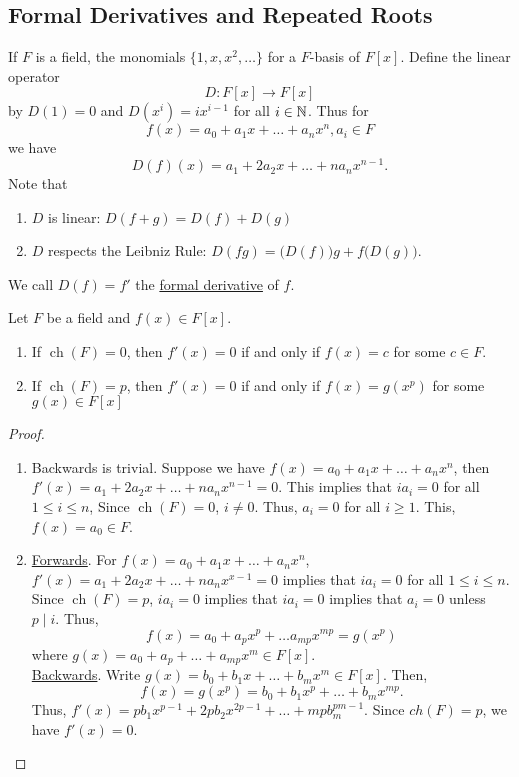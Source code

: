 \documentclass[11pt]{article}
\DeclareMathOperator{\ch}{ch}
\begin{document}
\subsection{Formal Derivatives and Repeated Roots}
\begin{definition}
If $F$ is a field, the monomials $\{1, x, x^2, \dots\}$ for a $F$-basis of
$F[x]$. Define the linear operator
\begin{equation*}
D:F[x] \to F[x]
\end{equation*}
by $D(1) = 0$ and $D(x^i) = ix^{i-1}$ for all $i \in \mathbb{N}$. Thus for
\begin{equation*}
f(x) = a_0 + a_1x + \dots + a_nx^n, a_i \in F
\end{equation*}
we have
\begin{equation*}
D(f)(x) = a_1 + 2a_2x + \dots + na_nx^{n-1}.
\end{equation*}
Note that
\begin{enumerate}
\item $D$ is linear: $D(f+g) = D(f) + D(g)$
\item $D$ respects the Leibniz Rule: $D(fg) = \big(D(f)\big)g +
f\big(D(g)\big)$.
\end{enumerate}
We call $D(f) = f'$ the \underline{formal derivative} of $f$.
\end{definition}
\begin{theorem}
Let $F$ be a field and $f(x) \in F[x]$.
\begin{enumerate}
\item If $\ch(F) = 0$, then $f'(x) = 0$ if and only if $f(x) = c$ for some $c
\in F$.
\item If $\ch(F) = p$, then $f'(x) = 0$ if and only if $f(x) = g(x^p)$ for some
$g(x) \in F[x]$
\end{enumerate}
\label{theorem18}
\end{theorem}
\begin{proof}\leavevmode
\begin{enumerate}
\item Backwards is trivial. Suppose we have $f(x) = a_0 + a_1x + \dots +
a_nx^n$, then $f'(x) = a_1 + 2a_2x + \dots + na_nx^{n-1} = 0$. This implies that
$ia_i = 0$ for all $1 \leq i \leq n$, Since $\ch(F) = 0$, $i \neq 0$. Thus,
$a_i = 0$ for all $i \geq 1$. This, $f(x) = a_0 \in F$.
\item 
\underline{Forwards}. For $f(x) = a_0 + a_1x + \dots + a_nx^n$, $f'(x) = a_1 +
2a_2x + \dots + na_nx^{x-1} = 0$ implies that $ia_i = 0$ for all $1 \leq i \leq
n$. Since $\ch(F) = p$, $ia_i = 0$ implies that $ia_i = 0$ implies that
$a_i = 0$ unless $p \mid i$. Thus,
\begin{equation*}
f(x) = a_0 + a_px^p + \dots a_{mp}x^{mp} = g(x^p)
\end{equation*}
where $g(x) = a_0 + a_p + \dots +a_{mp}x^m \in F[x]$.\\
\underline{Backwards}. Write $g(x) = b_0 + b_1x + \dots + b_mx^m \in
F[x]$. Then,
\begin{equation*}
f(x) = g(x^p) = b_0 + b_1x^p + \dots + b_mx^{mp}.
\end{equation*}
Thus, $f'(x) = pb_1x^{p-1} + 2pb_2x^{2p-1} + \dots + mpb_m^{pm-1}$. Since
$ch(F) = p$, we have $f'(x) = 0$.
\end{enumerate}
\end{proof}
\end{document}
